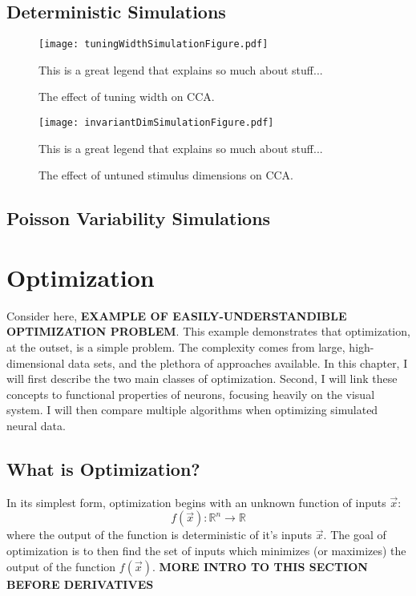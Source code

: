 \subsection*{Deterministic Simulations}


\begin{figure}
	\centering
	\texttt{[image: tuningWidthSimulationFigure.pdf]}
	\caption{The effect of tuning width on CCA.}{This is a great legend that explains so much about stuff...}
\end{figure}


\begin{figure}
	\centering
	\texttt{[image: invariantDimSimulationFigure.pdf]}
	\caption{The effect of untuned stimulus dimensions on CCA.}{This is a great legend that explains so much about stuff...}
\end{figure}


\subsection*{Poisson Variability Simulations}


\section*{\color{sectionBlue} Optimization}
Consider here, \textbf{EXAMPLE OF EASILY-UNDERSTANDIBLE OPTIMIZATION PROBLEM}. This example demonstrates that optimization, at the outset, is a simple problem. The complexity comes from large, high-dimensional data sets, and the plethora of approaches available. In this chapter, I will first describe the two main classes of optimization. Second, I will link these concepts to functional properties of neurons, focusing heavily on the visual system. I will then compare multiple algorithms when optimizing simulated neural data. 
\subsection*{What is Optimization?}
In its simplest form, optimization begins with an unknown function of inputs $\vec{x}$:
\begin{equation}
	f(\vec{x}) : \mathbb{R}^{n} \rightarrow \mathbb{R}
\end{equation}
where the output of the function is deterministic of it's inputs $\vec{x}$. The goal of optimization is to then find the set of inputs which minimizes (or maximizes) the output of the function $f(\vec{x})$. \textbf{MORE INTRO TO THIS SECTION BEFORE DERIVATIVES}

